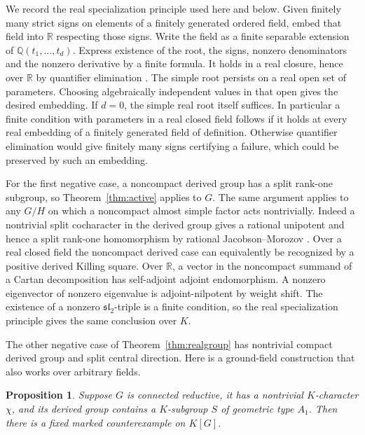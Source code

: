 \documentclass[11pt]{article}
\newtheorem{proposition}[theorem]{Proposition}
\newcommand{\RR}{\mathbb R}
\newcommand{\QQ}{\mathbb Q}
\begin{document}
We record the real specialization principle used here and below.
Given finitely many strict signs on elements of a finitely generated
ordered field, embed that field into \(\RR\) respecting those signs.
Write the field as a finite separable extension of
\(\QQ(t_1,\ldots,t_d)\). Express existence of the root, the signs,
nonzero denominators and the nonzero derivative by a finite formula.
It holds in a real closure, hence over \(\RR\) by quantifier
elimination \cite{Tarski}. The simple root persists on a real open
set of parameters. Choosing algebraically independent values in
that open gives the desired embedding. If \(d=0\), the simple real
root itself suffices. In particular a finite condition with
parameters in a real closed field follows if it holds at every real
embedding of a finitely generated field of definition. Otherwise
quantifier elimination would give finitely many signs certifying a
failure, which could be preserved by such an embedding.

For the first negative case, a noncompact derived group has a split
rank-one subgroup, so Theorem~\ref{thm:active} applies to \(G\).
The same argument applies to any \(G/H\) on which a noncompact almost
simple factor acts nontrivially. Indeed a nontrivial split
cocharacter in the derived group gives a rational unipotent and
hence a split rank-one homomorphism by rational Jacobson--Morozov
\cite{JM}. Over a real closed field the noncompact derived case can
equivalently be recognized by a positive derived Killing square.
Over \(\RR\), a vector in the noncompact summand of a Cartan
decomposition has self-adjoint adjoint endomorphism. A nonzero
eigenvector of nonzero eigenvalue is adjoint-nilpotent by weight
shift. The existence of a nonzero \(\mathfrak{sl}_2\)-triple is a
finite condition, so the real specialization principle gives
the same conclusion over \(K\).

The other negative case of Theorem~\ref{thm:realgroup} has nontrivial
compact derived group and split central direction. Here is a
ground-field construction that also works over arbitrary fields.

\begin{proposition}\label{prop:central}
Suppose \(G\) is connected reductive, it has a nontrivial \(K\)-character
\(\chi\), and its derived group contains a \(K\)-subgroup \(S\) of
geometric type \(A_1\). Then there is a fixed marked counterexample
on \(K[G]\).
\end{proposition}
\end{document}
